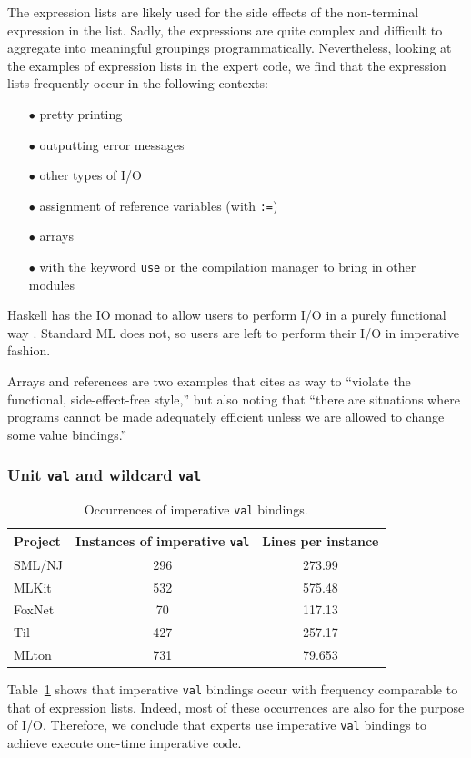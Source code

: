 \documentclass[12pt,abstracton]{scrartcl}
\begin{document}
The expression lists are likely used for the side effects of the non-terminal
expression in the list. Sadly, the expressions are quite complex and difficult
to aggregate into meaningful groupings programmatically. Nevertheless,
looking at the examples of expression lists in the expert code, we find that
the expression lists frequently occur in the following contexts:
\begin{itemize}
\item[$\bullet$] pretty printing
\item[$\bullet$] outputting error messages
\item[$\bullet$] other types of I/O
\item[$\bullet$] assignment of reference variables (with \texttt{:=})
\item[$\bullet$] arrays
\item[$\bullet$] with the keyword \texttt{use} or the compilation manager to bring in other modules
\end{itemize}

Haskell has the IO monad to allow users to perform I/O in a purely functional way \cite{Jon93}.
Standard ML does not, so users are left to perform their
I/O in imperative fashion.

Arrays and references are two examples that \cite{Ull98} cites as way to ``violate the functional,
side-effect-free style,'' but also noting that ``there are situations where programs cannot
be made adequately efficient unless we are allowed to change some value bindings.''
\subsubsection{Unit \texttt{val} and wildcard \texttt{val}}
\begin{table}[h!]
\centering
\begin{tabular}{|l||c|c|}
\hline
Project & Instances of imperative \texttt{val} & Lines per instance \\ \hline\hline
SML/NJ & 296 & 273.99 \\
MLKit & 532 & 575.48 \\
FoxNet & 70 & 117.13 \\
Til & 427 & 257.17 \\
MLton & 731 & 79.653 \\ \hline
\end{tabular}
\caption{Occurrences of imperative \texttt{val} bindings.}
\label{table:val}
\end{table}

Table~\ref{table:val} shows that imperative \texttt{val} bindings
occur with frequency comparable to that of expression lists.
Indeed, most of these occurrences are also for the purpose of I/O.
Therefore, we conclude that experts use imperative \texttt{val} bindings
to achieve execute one-time imperative code.
\end{document}
